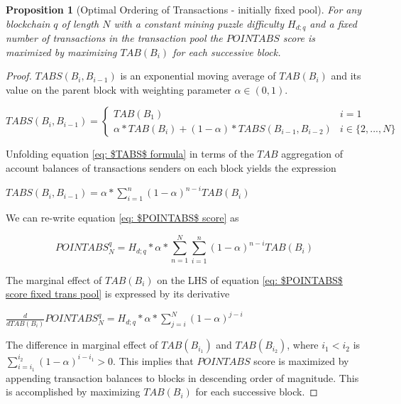 \documentclass[11pt]{article}
\theoremstyle{plain}
\newtheorem{proposition}{Proposition}[section]
\begin{document}
\begin{proposition}[Optimal Ordering of Transactions - initially fixed pool]
\label{prop: Optimal Ordering of Transactions - initially fixed pool}
For any blockchain $q$ of length $N$ with a constant mining puzzle difficulty $H_{d;q}$ and a fixed number of transactions in the transaction pool the $POINTABS$ score is maximized by maximizing $TAB(B_{i})$ for each successive block. 
\end{proposition}

\begin{proof}
$TABS(B_{i}, B_{i-1})$ is an exponential moving  average of $TAB(B_{i})$ and its value on the parent block with weighting parameter $\alpha \in (0,1)$.

\begin{equation}
\label{eq: $TABS$ formula}
TABS(B_{i}, B_{i-1}) = 
    \begin{cases}
        TAB(B_{1}) & i = 1\\
        \alpha * TAB(B_{i}) + (1 - \alpha)*TABS(B_{i-1}, B_{i-2}) & i \in \{2,...,N\}
    \end{cases}
\end{equation}

Unfolding equation \ref{eq: $TABS$ formula} in terms of the $TAB$ aggregation of account balances of transactions senders on each block yields the expression

$TABS(B_{i}, B_{i-1}) = \alpha*\sum_{i =1}^{n}(1-\alpha)^{n-i}TAB(B_{i})$

We can re-write equation \ref{eq: $POINTABS$ score} as

\begin{equation}
\label{eq: $POINTABS$ score fixed trans pool}
POINTABS_{N}^{q} = H_{d;q}*\alpha*\sum_{n=1}^{N}\sum_{i=1}^{n}(1-\alpha)^{n-i}TAB(B_{i})
\end{equation}

The marginal effect of $TAB(B_{i})$ on the LHS of equation \ref{eq: $POINTABS$ score fixed trans pool} is expressed by its derivative

$\frac{d}{d TAB(B_{i})}POINTABS_{N}^{q} = H_{d;q}*\alpha*\sum_{j=i}^{N}(1-\alpha)^{j-i}$

The difference in marginal effect of $TAB(B_{i_{1}})$ and $TAB(B_{i_{2}})$, where $i_{1} < i_{2}$ is $\sum_{i =i_{1}}^{i_{2}}(1-\alpha)^{i - i_{1}} > 0$. This implies that $POINTABS$ score is maximized by appending transaction balances to blocks in descending order of magnitude. This is accomplished by maximizing  $TAB(B_{i})$ for each successive block. 
\end{proof}
\end{document}

